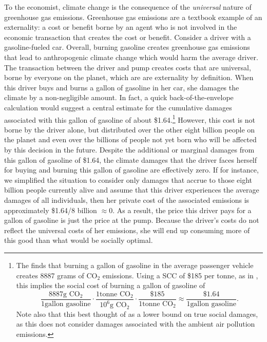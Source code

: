 To the economist, climate change is the consequence of the \emph{universal} nature of greenhouse gas emissions. Greenhouse gas emissions  are a textbook example of an externality: a cost or benefit borne by an agent who is not involved in the economic transaction that creates the cost or benefit. Consider a driver with a gasoline-fueled car. Overall, burning gasoline creates greenhouse gas emissions that lead to anthropogenic climate change which would harm the average driver. The transaction between the driver and pump creates costs that are universal, borne by everyone on the planet, which are are externality by definition. When this driver buys and burns a gallon of gasoline in her car, she damages the climate by a non-negligible amount. In fact, a quick back-of-the-envelope calculation would suggest a central estimate for the cumulative damages associated with this gallon of gasoline of about \$1.64.\footnote{The \cite{epa2022greenhouse} finds that burning a gallon of gasoline in the average passenger vehicle creates 8887 grams of CO$_2$ emissions. Using a SCC of \$185 per tonne, as in \cite{rennert2022comprehensive}, this implies the social cost of burning a gallon of gasoline of 
$$\frac{8887 \text{g CO$_2$}}{1 \text{gallon gasoline}} \cdot \frac{1 \text{tonne CO$_2$}}{10^6 \text{g CO$_2$}} \cdot \frac{\$185}{1 \text{tonne CO$_2$}} \approx \frac{\$1.64}{1 \text{gallon gasoline}}.$$
Note also that this best thought of as a lower bound on true social damages, as this does not consider damages associated with the ambient air pollution emissions.} However, this cost is not borne by the driver alone, but distributed over the other eight billion people on the planet and even over the billions of people not yet born who will be affected by this decision in the future. Despite the additional or marginal damages from this gallon of gasoline of \$1.64, the climate damages that the driver faces herself for buying and burning this gallon of gasoline are effectively zero. If for instance, we simplified the situation to consider only damages that accrue to those eight billion people currently alive and assume that this driver experiences the average damages of all individuals, then her private cost of the associated emissions is approximately \$1.64/8 billion $\approx 0$. As a result, the price this driver pays for a gallon of gasoline is just the price at the pump. Because the driver's costs do not reflect the universal costs of her emissions, she will end up consuming more of this good than what would be socially optimal.

